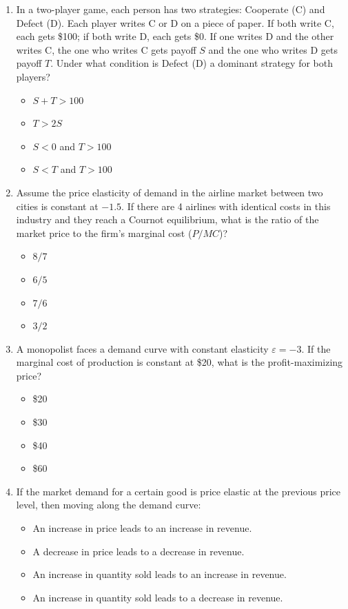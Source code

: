 \documentclass[12pt, a4paper]{article}
\begin{document}
\begin{enumerate}
\item In a two-player game, each person has two strategies: Cooperate (C) and Defect (D). Each player writes C or D on a piece of paper. If both write C, each gets \$100; if both write D, each gets \$0. If one writes D and the other writes C, the one who writes C gets payoff $S$ and the one who writes D gets payoff $T$. Under what condition is Defect (D) a dominant strategy for both players?
    \begin{itemize}
        \item[A.] $S + T > 100$
        \item[B.] $T > 2S$
        \item[C.] $S < 0$ and $T > 100$
        \item[D.] $S < T$ and $T > 100$
    \end{itemize}

\item Assume the price elasticity of demand in the airline market between two cities is constant at $-1.5$. If there are 4 airlines with identical costs in this industry and they reach a Cournot equilibrium, what is the ratio of the market price to the firm's marginal cost ($P/MC$)?
    \begin{itemize}
        \item[A.] $8/7$
        \item[B.] $6/5$
        \item[C.] $7/6$
        \item[D.] $3/2$
    \end{itemize}

\item A monopolist faces a demand curve with constant elasticity $\varepsilon = -3$. If the marginal cost of production is constant at \$20, what is the profit-maximizing price?
    \begin{itemize}
        \item[A.] \$20
        \item[B.] \$30
        \item[C.] \$40
        \item[D.] \$60
    \end{itemize}

    \item If the market demand for a certain good is price elastic at the previous price level, then moving along the demand curve:
    \begin{itemize}
        \item[A.] An increase in price leads to an increase in revenue.
        \item[B.] A decrease in price leads to a decrease in revenue.
        \item[C.] An increase in quantity sold leads to an increase in revenue.
        \item[D.] An increase in quantity sold leads to a decrease in revenue.
    \end{itemize}


\end{enumerate}
\end{document}
